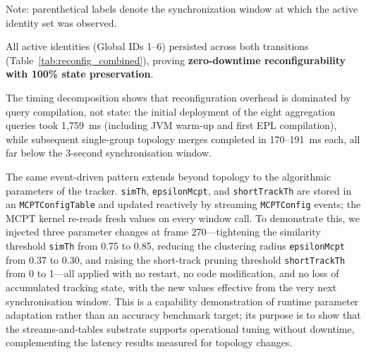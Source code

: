 \documentclass[conference]{IEEEtran}
\begin{document}
\begin{table}[t!]
\centering
\caption{Live Network Reconfiguration Timing and Global ID State Continuity}
\label{tab:reconfig_combined}
\vspace{2pt}
\parbox{\linewidth}{\raggedright\footnotesize Note: parenthetical labels denote the synchronization window at which the active identity set was observed.}
\end{table}

All active identities (Global IDs 1--6) persisted across both transitions (Table~\ref{tab:reconfig_combined}), proving \textbf{zero-downtime reconfigurability with 100\% state preservation}.

The timing decomposition shows that reconfiguration overhead is dominated by query compilation, not state: the initial deployment of the eight aggregation queries took 1{,}759~ms (including JVM warm-up and first EPL compilation), while subsequent single-group topology merges completed in 170--191~ms each, all far below the 3-second synchronisation window.

The same event-driven pattern extends beyond topology to the algorithmic parameters of the tracker. \texttt{simTh}, \texttt{epsilonMcpt}, and \texttt{shortTrackTh} are stored in an \texttt{MCPTConfigTable} and updated reactively by streaming \texttt{MCPTConfig} events; the MCPT kernel re-reads fresh values on every window call. To demonstrate this, we injected three parameter changes at frame 270---tightening the similarity threshold \texttt{simTh} from 0.75 to 0.85, reducing the clustering radius \texttt{epsilonMcpt} from 0.37 to 0.30, and raising the short-track pruning threshold \texttt{shortTrackTh} from 0 to 1---all applied with no restart, no code modification, and no loss of accumulated tracking state, with the new values effective from the very next synchronisation window. This is a capability demonstration of runtime parameter adaptation rather than an accuracy benchmark target; its purpose is to show that the streams-and-tables substrate supports operational tuning without downtime, complementing the latency results measured for topology changes.
\end{document}
